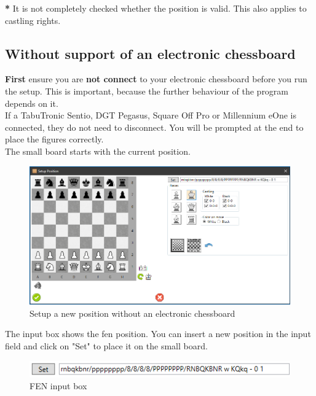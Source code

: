 \documentclass[11pt,a4paper]{article}
\begin{document}
\textbf{{\color{red}*}} It is not completely checked whether the position is valid. This also applies to castling rights.

\subsection{Without support of an electronic chessboard}

\textbf{First} ensure you are \textbf{not connect} to your electronic chessboard before you run the setup. This is important, because the further behaviour of the program depends on it.\\
If a TabuTronic Sentio, DGT Pegasus, Square Off Pro or Millennium eOne is connected, they do not need to disconnect. You will be prompted at the end to place the figures correctly. \\
The small board starts with the current position.

\begin{figure}[H]
	\centering
	\includegraphics[scale=0.5]{SetupPosition2.png}
	\caption{Setup a new position without an electronic chessboard}
	\label{fig:SetupPosition2}
\end{figure}

The input box shows the fen position. You can insert a new position in the input field and click on "Set" to place it on the small board.

\begin{figure}[H]
	\centering
	\includegraphics[scale=0.55]{SetupPosition3.png}
	\caption{FEN input box}
	\label{fig:SetupPosition3}
\end{figure}
\end{document}
